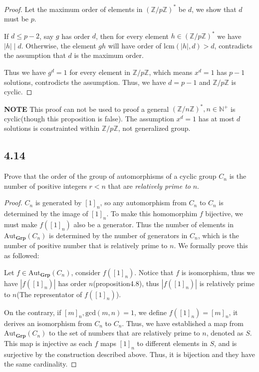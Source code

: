 \documentclass[a4paper, pdf, 12pt]{article}
\newcommand{\divides}{\mid}
\begin{document}
\begin{proof}
  Let the maximum order of elements in $(\mathbb{Z}/p\mathbb{Z})^{*}$ be $d$, we show that $d$ must be $p$.

  If $d\leq p-2$, say $g$ has order $d$, then for every element $h\in (\mathbb{Z}/p\mathbb{Z})^{*}$ we have $|h|\divides d$. Otherwise,
  the element $gh$ will have order of $\mbox{lcm}(|h|, d) > d$, contradicts the assumption that $d$ is the maximum order.

  Thus we have $g^{d} = 1$ for every element in $\mathbb{Z}/p\mathbb{Z}$, which means $x^{d} = 1$ has $p-1$ solutions, controdicts the
  assumption. Thus, we have $d = p-1$ and $\mathbb{Z}/p\mathbb{Z}$ is cyclic.
\end{proof}

\noindent
\textbf{NOTE} This proof can not be used to proof a general $(\mathbb{Z}/n\mathbb{Z})^{*}, n\in \mathbb{N}^{+}$  is cyclic(though this
proposition is false). The assumption $x^{d}=1$ has at most $d$ solutions is constrainted within $\mathbb{Z}/p\mathbb{Z}$, not generalized
group.

\subsection*{4.14}
Prove that the order of the group of automorphisms of a cyclic group $C_n$ is
the number of positive integers $r < n$ that are \textit{relatively prime to} $n$.
\begin{proof}
  $C_n$ is generated by $[1]_{n}$, so any automorphism from $C_n$ to $C_n$ is determined by the image of
  $[1]_{n}$. To make this homomorphim $f$ bijective, we must make $f([1]_{n})$ also be a generator. Thus the
  number of elements in $\mbox{Aut}_{\mathbf{Grp}}(C_n)$ is determined by the number of generators in $C_{n}$, which is
  the number of positive number that is relatively prime to $n$. We formally prove this as followed:

  Let $f\in \mbox{Aut}_{\mathbf{Grp}}(C_n)$, consider $f([1]_{n})$. Notice that $f$ is isomorphism, thus we have $|f([1]_{n})|$ has order
  $n$(proposition4.8), thus $|f([1]_{n})|$ is relatively prime to $n$(The representator of $f([1]_{n})$).

  On the contrary, if $[m]_{n}, \mbox{gcd}(m, n)=1$, we define $f([1]_{n})=[m]_{n}$, it derives an isomorphism from $C_{n}$ to $C_{n}$. Thus, we have
  established a map from $\mbox{Aut}_{\mathbf{Grp}}(C_n)$ to the set of numbers that are relatively prime to $n$, denoted as $S$. This map is injective as each $f$ maps
  $[1]_{n}$ to different elements in $S$, and is surjective by the construction described above. Thus, it is bijection and they have the
  same cardinality.
\end{proof}
\end{document}
